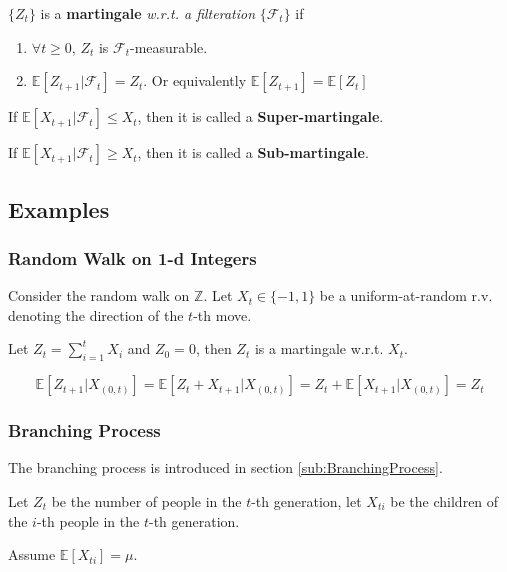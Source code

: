         \begin{definition}\label{def:FancyMartingale}
            $\{Z_t\}$ is a \textbf{martingale} \emph{w.r.t. a filteration} $\{\mathcal{F}_t\}$ if
            \begin{enumerate}
                \item $\forall t \ge 0$, $Z_t$ is $\mathcal{F}_t$-measurable.
                \item $\mathbb{E}[Z_{t+1}|\mathcal{F}_t] = Z_t$. Or equivalently $\mathbb{E}[Z_{t+1}] = \mathbb{E}[Z_t]$
            \end{enumerate}
        \end{definition}

        \begin{remark}
            If $\mathbb{E}[X_{t+1}|\mathcal{F}_t] \le X_t$, then it is called a \textbf{Super-martingale}.

            If $\mathbb{E}[X_{t+1}|\mathcal{F}_t] \ge X_t$, then it is called a \textbf{Sub-martingale}.
        \end{remark}

    \subsection{Examples}
        \subsubsection{Random Walk on 1-d Integers}
        Consider the random walk on $\mathbb{Z}$. Let $X_t \in \{-1, 1\}$ be a uniform-at-random r.v. denoting the direction of the $t$-th move.

        Let $Z_t = \sum_{i=1}^tX_i$ and $Z_0=0$, then $Z_t$ is a martingale w.r.t. $X_t$.

        \[ \mathbb{E}[Z_{t+1}|X_{(0,t)}] = \mathbb{E}[Z_t + X_{t+1}|X_{(0,t)}] = Z_t + \mathbb{E}[X_{t+1}|X_{(0,t)}] = Z_t \]

        \subsubsection{Branching Process}
        The branching process is introduced in section \ref{sub:BranchingProcess}.

        Let $Z_t$ be the number of people in the $t$-th generation, let $X_{ti}$ be the children of the $i$-th people in the $t$-th generation.

        Assume $\mathbb{E}[X_{ti}] = \mu$.

